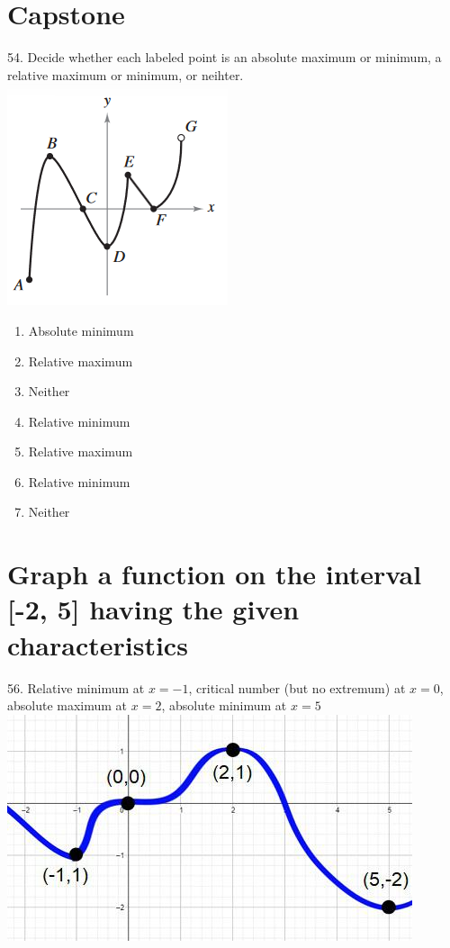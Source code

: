 \documentclass[11pt]{article}
\begin{document}
\section{Capstone}
54. Decide whether each labeled point is an absolute maximum or minimum, a relative maximum or minimum, or neihter.\\
\includegraphics{54.png}
\begin{enumerate}[A:]
    \item Absolute minimum
    \item Relative maximum
    \item Neither
    \item Relative minimum
    \item Relative maximum
    \item Relative minimum
    \item Neither
\end{enumerate}

\section{Graph a function on the interval [-2, 5] having the given characteristics}
56. Relative minimum at $x=-1$, critical number (but no extremum) at $x=0$, absolute maximum at $x=2$, absolute minimum at $x=5$\\
\includegraphics{56.jpeg}
\end{document}
